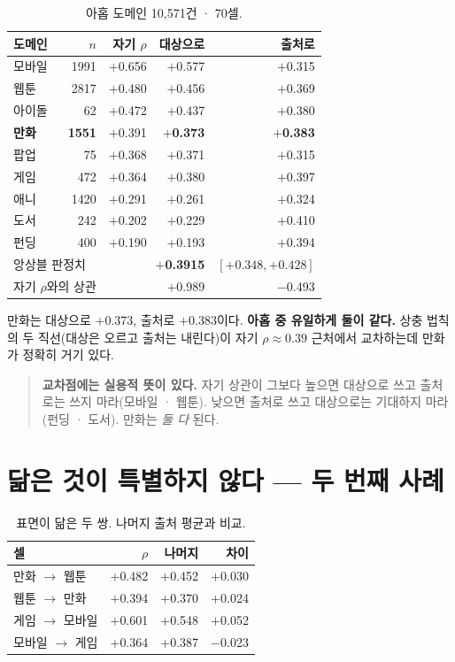 \documentclass[10pt]{article}
\begin{document}
\begin{table}[t]
\centering\tsize
\caption{아홉 도메인 10,571건 · 70셀.}
\begin{tabular}{lrrrr}
\toprule
도메인 & $n$ & 자기 $\rho$ & 대상으로 & 출처로 \\
\midrule
모바일 & 1991 & $+$0.656 & $+$0.577 & $+$0.315 \\
웹툰 & 2817 & $+$0.480 & $+$0.456 & $+$0.369 \\
아이돌 & 62 & $+$0.472 & $+$0.437 & $+$0.380 \\
\textbf{만화} & \textbf{1551} & $+$0.391 & \textbf{$+$0.373} & \textbf{$+$0.383} \\
팝업 & 75 & $+$0.368 & $+$0.371 & $+$0.315 \\
게임 & 472 & $+$0.364 & $+$0.380 & $+$0.397 \\
애니 & 1420 & $+$0.291 & $+$0.261 & $+$0.324 \\
도서 & 242 & $+$0.202 & $+$0.229 & $+$0.410 \\
펀딩 & 400 & $+$0.190 & $+$0.193 & $+$0.394 \\
\midrule
\multicolumn{2}{l}{앙상블 판정치} & \multicolumn{2}{r}{\textbf{$+$0.3915}} &
$[+0.348, +0.428]$ \\
\multicolumn{2}{l}{자기 $\rho$와의 상관} & & $+$0.989 & $-$0.493 \\
\bottomrule
\end{tabular}
\end{table}

만화는 대상으로 $+$0.373, 출처로 $+$0.383이다. \textbf{아홉 중 유일하게 둘이
같다.} 상충 법칙의 두 직선(대상은 오르고 출처는 내린다)이 자기 $\rho\approx0.39$
근처에서 교차하는데 만화가 정확히 거기 있다.

\begin{quote}\fontsize{9.5}{11.5}\selectfont
\textbf{교차점에는 실용적 뜻이 있다.} 자기 상관이 그보다 높으면 대상으로 쓰고
출처로는 쓰지 마라(모바일 · 웹툰). 낮으면 출처로 쓰고 대상으로는 기대하지 마라
(펀딩 · 도서). 만화는 \emph{둘 다} 된다.
\end{quote}

\section{닮은 것이 특별하지 않다 --- 두 번째 사례}

\begin{table}[t]
\centering\tsize
\caption{표면이 닮은 두 쌍. 나머지 출처 평균과 비교.}
\begin{tabular}{lrrr}
\toprule
셀 & $\rho$ & 나머지 & 차이 \\
\midrule
만화 $\to$ 웹툰 & $+$0.482 & $+$0.452 & $+$0.030 \\
웹툰 $\to$ 만화 & $+$0.394 & $+$0.370 & $+$0.024 \\
\midrule
게임 $\to$ 모바일 & $+$0.601 & $+$0.548 & $+$0.052 \\
모바일 $\to$ 게임 & $+$0.364 & $+$0.387 & $-$0.023 \\
\bottomrule
\end{tabular}
\end{table}
\end{document}
